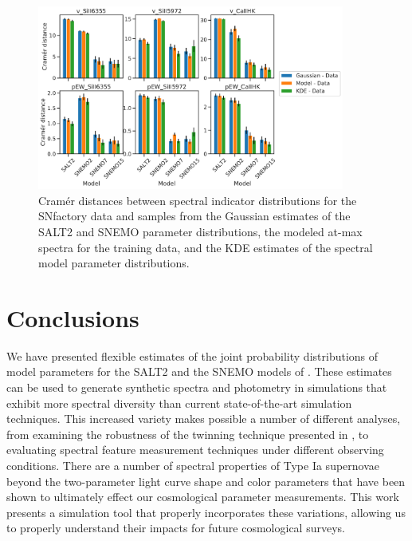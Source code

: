\begin{figure}
    \centering
    \includegraphics[width=0.9\textwidth]{figures/snemo_kde/cramer_distances_spec_feats.pdf}
    \caption{Cram\'{e}r distances between spectral indicator distributions for the SNfactory data and samples from the Gaussian estimates of the SALT2 and SNEMO parameter distributions, the modeled at-max spectra for the training data, and the KDE estimates of the spectral model parameter distributions.}
    \label{fig:cramer_spec_feat}
\end{figure}

\section{Conclusions}
\label{sec:conclusions}
We have presented flexible estimates of the joint probability distributions of model parameters for the SALT2 and the SNEMO models of \cite{saunders_snemo_2018}. These estimates can be used to generate synthetic spectra and photometry in simulations that exhibit more spectral diversity than current state-of-the-art simulation techniques. This increased variety makes possible a number of different analyses, from examining the robustness of the twinning technique presented in \cite{fakhouri_improving_2015}, to evaluating spectral feature measurement techniques under different observing conditions. There are a number of spectral properties of Type Ia supernovae beyond the two-parameter light curve shape and color parameters that have been shown to ultimately effect our cosmological parameter measurements. This work presents a simulation tool that properly incorporates these variations, allowing us to properly understand their impacts for future cosmological surveys.
